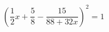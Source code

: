 \begin{ex}[type=equation]
	\begin{condition}
		$\left(\dfrac{1}{2}x + \dfrac{5}{8}-\dfrac{15}{88 + 32x}\right)^2 = 1$
	\end{condition}
\end{ex}
